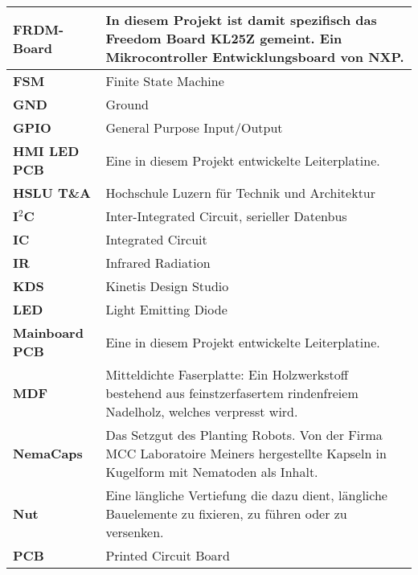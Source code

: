 \begin{table}[H]
\begin{tabular}{|L{3cm}|L{12.5cm}|}
		\hline		
		\textbf{FRDM-Board} & In diesem Projekt ist damit spezifisch das Freedom Board KL25Z gemeint. Ein Mikrocontroller Entwicklungsboard von NXP. \\
		
		\hline
		\textbf{FSM} & Finite State Machine\\
		
		\hline
		\textbf{GND} & Ground\\
	
		\hline
		\textbf{GPIO} & General Purpose Input/Output\\
	
		\hline
		\textbf{HMI LED PCB} & Eine in diesem Projekt entwickelte Leiterplatine. \\
	
		\hline
		\textbf{HSLU T\&A} & Hochschule Luzern für Technik und Architektur\\ 
		
		\hline
		\textbf{I$^{2}$C} & Inter-Integrated Circuit, serieller Datenbus\\
		
		\hline
		\textbf{IC} & Integrated Circuit\\
		
		\hline
		\textbf{IR} & Infrared Radiation\\
		
		\hline
		\textbf{KDS} & Kinetis Design Studio\\

		\hline
		\textbf{LED} & Light Emitting Diode\\

		\hline
		\textbf{Mainboard PCB} & Eine in diesem Projekt entwickelte Leiterplatine. \\

		\hline
		\textbf{MDF} &  Mitteldichte Faserplatte: Ein Holzwerkstoff bestehend aus feinstzerfasertem rindenfreiem Nadelholz, welches verpresst wird.  \\		

		\hline
		\textbf{NemaCaps} &  Das Setzgut des Planting Robots. Von der Firma MCC Laboratoire Meiners hergestellte Kapseln in Kugelform mit Nematoden als Inhalt. \\

		\hline
		\textbf{Nut} &  Eine längliche Vertiefung die dazu dient,  längliche Bauelemente zu fixieren, zu führen oder zu versenken.\\	
		
	 	\hline
	 	\textbf{PCB} &	Printed Circuit Board\\
		

\end{tabular}
\end{table}
